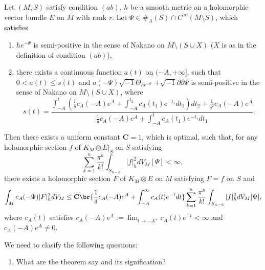 \begin{thm}\label{t:guan-zhou-semicontinu2}
Let $(M,S)$ satisfy condition $(ab)$,
$h$ be a smooth metric on a holomorphic vector bundle $E$ on $M$ with rank $r$.
Let $\Psi\in \#_{A}(S)\cap C^{\infty}(M\setminus S)$, which satisfies

\begin{enumerate}[label=\arabic*)]
  \item $he^{-\Psi}$ is semi-positive in the sense of Nakano on
$M\setminus (S\cup X)$ ($X$ is as in the definition of condition
$(ab)$),
\item there exists a continuous function $a(t)$ on $(-A,+\infty]$,
such that $0<a(t)\leq s(t)$ and
$a(-\Psi)\sqrt{-1}\Theta_{he^{-\Psi}}$ $+\sqrt{-1}\partial\bar\partial\Psi$
is semi-positive in the sense of Nakano on $M\setminus (S\cup X)$,
where $$s(t)=\frac{\int_{-A}^{t}(\frac{1}
{\delta}c_{A}(-A)e^{A}+\int_{-A}^{t_{2}}c_{A}(t_{1})e^{-t_{1}}dt_{1})dt_{2}+\frac{1}{\delta^{2}}c_{A}(-A)e^{A}}
{\frac{1}{\delta}c_{A}(-A)e^{A}+\int_{-A}^{t}c_{A}(t_{1})e^{-t_{1}}dt_{1}}.$$
\end{enumerate}

Then there exists a uniform constant $\mathbf{C}=1$, which is
optimal, such that, for any holomorphic section $f$ of $K_{M}\otimes
E|_{S}$ on $S$ satisfying
\begin{equation}
\label{equ:condition}
\sum_{k=1}^{n}\frac{\pi^{k}}{k!}\int_{S_{n-k}}|f|^{2}_{h}dV_{M}[\Psi]<\infty,
\end{equation}
there
exists a holomorphic section $F$ of $K_{M}\otimes E$ on $M$ satisfying $F = f$ on $ S$ and
\begin{equation}
\label{equ:optimal_delta}
\int_{M}c_{A}(-\Psi)|F|^{2}_{h}dV_{M}
\leq\mathbf{C}\br{\frac{1}{\delta}c_{A}(-A)e^{A}+\int_{-A}^{\infty}c_{A}(t)e^{-t}dt}
\sum_{k=1}^{n}\frac{\pi^{k}}{k!}\int_{S_{n-k}}|f|^{2}_{h}dV_{M}[\Psi],
\end{equation}
where $c_{A}(t)$ satisfies $c_{A}(-A)e^{A}:=\lim_{t\to -A^{+}}c_{A}(t)e^{-t}<\infty$ and $c_{A}(-A)e^{A}\neq0$.
\end{thm}


\begin{remark}
  We need to clasify the following questions:
  \begin{enumerate}[label=\roman*)]
    \item What are the theorem say and its signification?
  \end{enumerate}
\end{remark}

